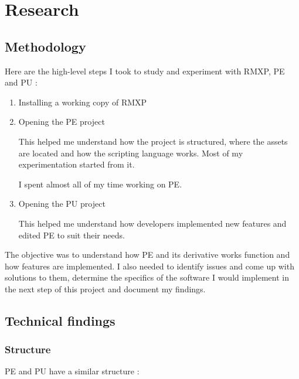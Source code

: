 \documentclass[11pt]{article}
\begin{document}
\newpage
\section{Research}

\subsection{Methodology}

Here are the high-level steps I took to study and experiment with RMXP, PE and PU :
\begin{enumerate}
	\item Installing a working copy of RMXP

	\item Opening the PE project
	
	This helped me understand how the project is structured, where the assets are located and how the scripting language works. Most of my experimentation started from it.
	
	I spent almost all of my time working on PE.
	
	\item Opening the PU project
	
	This helped me understand how developers implemented new features and edited PE to suit their needs.
\end{enumerate}

The objective was to understand how PE and its derivative works function and how features are implemented. I also needed to identify issues and come up with solutions to them, determine the specifics of the software I would implement in the next step of this project and document my findings.




\subsection{Technical findings}

\subsubsection{Structure}

PE and PU have a similar structure :
\end{document}
